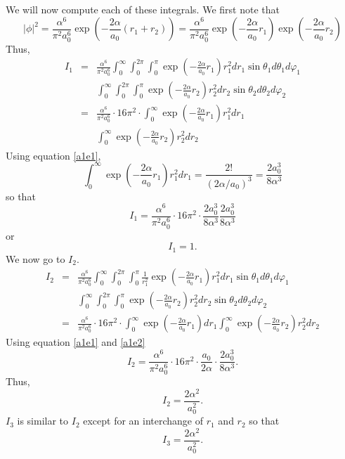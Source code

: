 \documentclass{article}
\numberwithin{equation}{section}
\begin{document}
We will now compute each of these integrals. We first note that
\[
|\phi|^2 = 
\frac{\alpha^6}{\pi^2 a_0^6}\exp\left(-\frac{2\alpha}{a_0}(r_1+r_2)\right)
= \frac{\alpha^6}{\pi^2 a_0^6}\exp\left(-\frac{2\alpha}{a_0}r_1\right)
\exp\left(-\frac{2\alpha}{a_0}r_2\right)  
\]
Thus,
\begin{eqnarray*}
I_1 &=& \frac{\alpha^6}{\pi^2 a_0^6}
\int_0^\infty\int_0^{2\pi}\int_0^\pi\exp\left(-\frac{2\alpha}{a_0}r_1
	\right) r_1^2dr_1\sin\theta_1d\theta_1d\varphi_1 \\
 & & 
\int_0^\infty\int_0^{2\pi}\int_0^\pi\exp\left(-\frac{2\alpha}{a_0}r_2
	\right) r_2^2dr_2\sin\theta_2d\theta_2d\varphi_2 \\
 &=& \frac{\alpha^6}{\pi^2 a_0^6}\cdot 16\pi^2 \cdot
 \int_0^\infty\exp\left(-\frac{2\alpha}{a_0}r_1\right)r_1^2dr_1 \\
 & & \int_0^\infty\exp\left(-\frac{2\alpha}{a_0}r_2\right)r_2^2dr_2 
\end{eqnarray*}
Using equation \eqref{a1e1},
\[
\int_0^\infty\exp\left(-\frac{2\alpha}{a_0}r_1\right)r_1^2dr_1 = 
\frac{2!}{(2\alpha/a_0)^3} = \frac{2a_0^3}{8\alpha^3}
\]
so that
\[
I_1 = \frac{\alpha^6}{\pi^2 a_0^6}\cdot 16\pi^2 \cdot
 \frac{2a_0^3}{8\alpha^3}\frac{2a_0^3}{8\alpha^3}
\]
or
\begin{equation}\label{s5e73}
I_1 = 1.
\end{equation}
We now go to $I_2$.
\begin{eqnarray*}
I_2 &=& \frac{\alpha^6}{\pi^2 a_0^6}
\int_0^\infty\int_0^{2\pi}\int_0^\pi
\frac{1}{r_1^2}\exp\left(-\frac{2\alpha}{a_0}r_1\right)
r_1^2dr_1\sin\theta_1d\theta_1d\varphi_1 \\
 & & 
\int_0^\infty\int_0^{2\pi}\int_0^\pi\exp\left(-\frac{2\alpha}{a_0}r_2
	\right) r_2^2dr_2\sin\theta_2d\theta_2d\varphi_2 \\
 &=& \frac{\alpha^6}{\pi^2 a_0^6}\cdot 16\pi^2 \cdot
 \int_0^\infty\exp\left(-\frac{2\alpha}{a_0}r_1\right)dr_1 
 \int_0^\infty\exp\left(-\frac{2\alpha}{a_0}r_2\right)r_2^2dr_2 
\end{eqnarray*}
Using equation \eqref{a1e1} and \eqref{a1e2}
\[
I_2 = \frac{\alpha^6}{\pi^2 a_0^6}\cdot 16\pi^2 \cdot \frac{a_0}{2\alpha}
\cdot \frac{2a_0^3}{8\alpha^3}.
\]
Thus,
\begin{equation}\label{s5e74}
I_2 = \frac{2\alpha^2}{a_0^2}.
\end{equation}
$I_3$ is similar to $I_2$ except for an interchange of $r_1$ and $r_2$ so
that
\begin{equation}\label{s5e75}
I_3 = \frac{2\alpha^2}{a_0^2}.
\end{equation}
\end{document}
